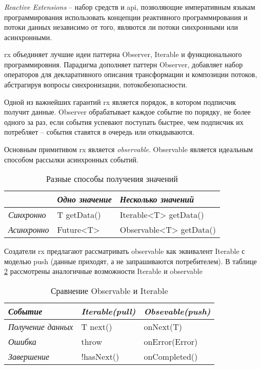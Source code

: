 \subsubsection{}
\label{sec:analysis:research:mobArch:rx}

\emph{Reactive Extensions} -- набор средств и \gls{api}, позволяющие императивным языкам программирования использовать концепции реактивного программирования и потоки данных независимо от того, являются ли потоки синхронными или асинхронными\cite{wiki:rx}.

\gls{rx} объединяет лучшие идеи паттерна Observer, Iterable и функционального программировния. Парадигма дополняет паттерн Observer, добавляет набор операторов для декларативного описания трансформации и композиции потоков, абстрагируя вопросы синхронизации, потокобезопасности.

Одной из важнейших гарантий \gls{rx} является порядок, в котором подписчик получит данные. Observer обрабатывает каждое событие по порядку, не более одного за раз, если события успевают поступать быстрее, чем подписчик их потребляет -- события ставятся в очередь или откидываются.

Основным примитивом \gls{rx} является \emph{\gls{observable}}. Observable является идеальным способом рассылки асинхронных событий.

\begin{table}[h!]
\caption{Разные способы получения значений}
\label{theory:archeticture:rx:call}
\centering
\begin{tabularx}{\textwidth}{ |X|X|X| } 
 \hline
  & \emph{Одно значение} & \emph{Несколько значений} \\ 
 \hline
 \emph{Синхронно} & T getData() & Iterable<T> getData() \\ 
 \hline
 \emph{Асинхронно} & Future<T> & Observable<T> getData() \\ 
 \hline
\end{tabularx}
\end{table}

Создатели \gls{rx} предлагают\cite{reactivex:introduction} рассматривать \gls{observable} как эквивалент Iterable с моделью push (данные приходят, а не запрашиваются потребителем). В таблице \ref{theory:archeticture:rx:iterable-observable} рассмотрены аналогичные возможности Iterable и \gls{observable}

\begin{table}[h!]
\caption{Сравнение Observable и Iterable}
\label{theory:archeticture:rx:iterable-observable}
\centering
\begin{tabularx}{\textwidth}{ |X|X|X| } 
 \hline
 \emph{Событие} & \emph{Iterable(pull)} & \emph{Obsevable(push)} \\ 
 \hline
 \emph{Получение данных} & T next() & onNext(T) \\ 
 \hline
 \emph{Ошибка} & throw & onError(Error) \\ 
 \hline
  \emph{Завершение} & !hasNext() & onCompleted() \\ 
 \hline
\end{tabularx}
\end{table}

